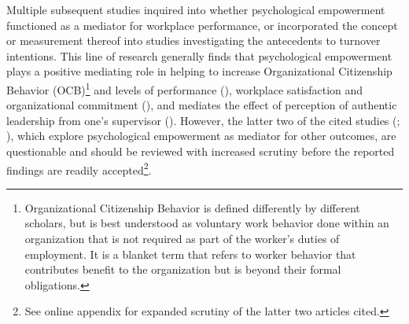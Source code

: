 \documentclass[
  11pt,
  a4paper,
]{article}
\begin{document}
Multiple subsequent studies inquired into whether psychological
empowerment functioned as a mediator for workplace performance, or
incorporated the concept or measurement thereof into studies
investigating the antecedents to turnover intentions. This line of
research generally finds that psychological empowerment plays a positive
mediating role in helping to increase Organizational Citizenship
Behavior (OCB)\footnote{Organizational Citizenship Behavior is defined
  differently by different scholars, but is best understood as voluntary
  work behavior done within an organization that is not required as part
  of the worker's duties of employment. It is a blanket term that refers
  to worker behavior that contributes benefit to the organization but is
  beyond their formal obligations.} and levels of performance
(), workplace satisfaction and
organizational commitment (), and mediates the effect of perception of authentic
leadership from one's supervisor
(). However, the latter two of the cited studies
(;
), which explore psychological empowerment as mediator for other
outcomes, are questionable and should be reviewed with increased
scrutiny before the reported findings are readily accepted\footnote{See
  online appendix for expanded scrutiny of the latter two articles
  cited.}.
\end{document}
